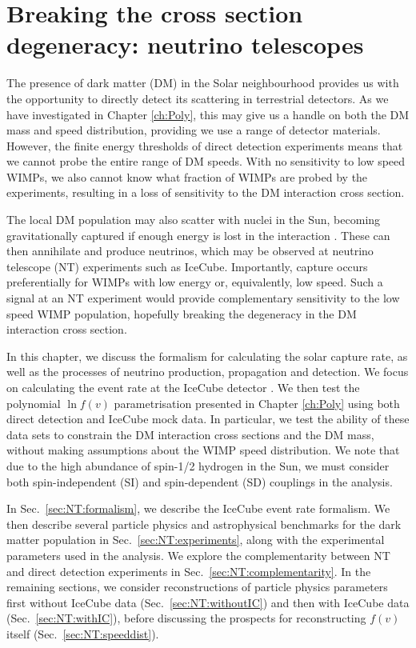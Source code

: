 \chapter[Neutrino telescopes]{Breaking the cross section degeneracy: neutrino telescopes}
\label{ch:NT}

The presence of dark matter (DM) in the Solar neighbourhood provides us with the opportunity to directly detect its scattering in terrestrial detectors. As we have investigated in Chapter \ref{ch:Poly}, this may give us a handle on both the DM mass and speed distribution, providing we use a range of detector materials. However, the finite energy thresholds of direct detection experiments means that we cannot probe the entire range of DM speeds. With no sensitivity to low speed WIMPs, we also cannot know what fraction of WIMPs are probed by the experiments, resulting in a loss of sensitivity to the DM interaction cross section.

The local DM population may also scatter with nuclei in the Sun, becoming gravitationally captured if enough energy is lost in the interaction \cite{Press:1985,Silk:1985, Gaisser:1986, Srednicki:1987, Griest:1987}. These can then annihilate and produce neutrinos, which may be observed at neutrino telescope (NT) experiments such as IceCube. Importantly, capture occurs preferentially for WIMPs with low energy or, equivalently, low speed. Such a signal at an NT experiment would provide complementary sensitivity to the low speed WIMP population, hopefully breaking the degeneracy in the DM interaction cross section. 

In this chapter, we discuss the formalism for calculating the solar capture rate, as well as the processes of neutrino production, propagation and detection. We focus on calculating the event rate at the IceCube detector \cite{Aartsen:2013b}. We then test the polynomial $\ln f(v)$ parametrisation presented in Chapter \ref{ch:Poly} using both direct detection and IceCube mock data. In particular, we test the ability of these data sets to constrain the DM interaction cross sections and the DM mass, without making assumptions about the WIMP speed distribution. We note that due to the high abundance of spin-1/2 hydrogen in the Sun, we must consider both spin-independent (SI) and spin-dependent (SD) couplings in the analysis.


In Sec.~\ref{sec:NT:formalism}, we describe the IceCube event rate formalism. We then describe several particle physics and astrophysical benchmarks for the dark matter population in Sec.~\ref{sec:NT:experiments}, along with the experimental parameters used in the analysis. We explore the complementarity between NT and direct detection experiments in Sec.~\ref{sec:NT:complementarity}. In the remaining sections, we consider reconstructions of particle physics parameters first without IceCube data (Sec.~\ref{sec:NT:withoutIC}) and then with IceCube data (Sec.~\ref{sec:NT:withIC}), before discussing the prospects for reconstructing $f(v)$ itself (Sec.~\ref{sec:NT:speeddist}).

